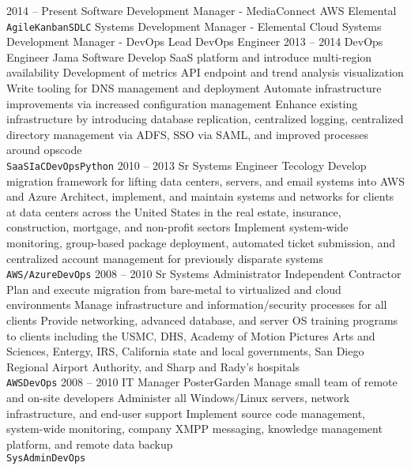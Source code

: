 \documentclass[10pt]{jvresume2020} %
\begin{document}
\begin{entrylist}
	\entry
		{2014 -- Present}
		{Software Development Manager - MediaConnect}
		{AWS Elemental}
		{\lorem \lorem \lorem\\ \texttt{Agile}\slashsep\texttt{Kanban}\slashsep\texttt{SDLC}}
	\entry
	  {}
		{Systems Development Manager - Elemental Cloud}
		{}
		{\lorem \lorem \lorem}
	\entry
	  {}
		{Systems Development Manager - DevOps}
		{}
		{\lorem \lorem \lorem}
	\entry
	  {}
		{Lead DevOps Engineer}
			{}
			{\lorem \lorem \lorem}
	\entry
		{2013 -- 2014}
		{DevOps Engineer}
		{Jama Software}
		{{Develop SaaS platform and introduce multi-region availability\linebreak
		Development of metrics API endpoint and trend analysis visualization\linebreak
		Write tooling for DNS management and deployment\linebreak
		Automate infrastructure improvements via increased configuration management\linebreak
		Enhance existing infrastructure by introducing database replication, centralized logging, centralized directory management via ADFS, SSO via SAML, and improved processes around opscode\\
} \texttt{SaaS}\slashsep\texttt{IaC}\slashsep\texttt{DevOps}\slashsep\texttt{Python}}
	\entry
		{2010 -- 2013}
		{Sr Systems Engineer}
		{Tecology}
		{{Develop migration framework for lifting data centers, servers, and email systems into AWS and Azure\linebreak
		Architect, implement, and maintain systems and networks for clients at data centers across the United States in the real estate, insurance, construction, mortgage, and non-profit sectors\linebreak
		Implement system-wide monitoring, group-based package deployment, automated ticket submission, and centralized account management for previously disparate systems\\
} \texttt{AWS/Azure}\slashsep\texttt{DevOps}}
	\entry
		{2008 -- 2010}
		{Sr Systems Administrator}
		{Independent Contractor}
		{{Plan and execute migration from bare-metal to virtualized and cloud environments\linebreak
		Manage infrastructure and information/security processes for all clients\linebreak
		Provide networking, advanced database, and server OS training programs to clients including the USMC, DHS, Academy of Motion Pictures Arts and Sciences, Entergy, IRS, California state and local governments, San Diego Regional Airport Authority, and Sharp and Rady’s hospitals\\
} \texttt{AWS}\slashsep\texttt{DevOps}}
	\entry
		{2008 -- 2010}
		{IT Manager}
		{PosterGarden}
		{{Manage small team of remote and on-site developers\linebreak
		Administer all Windows/Linux servers, network infrastructure, and end-user support\linebreak
		Implement source code management, system-wide monitoring, company XMPP messaging, knowledge management platform, and remote data backup\\
} \texttt{SysAdmin}\slashsep\texttt{DevOps}}
\end{entrylist}
\end{document}
